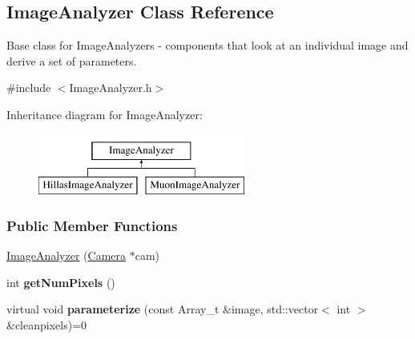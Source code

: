 \hypertarget{classImageAnalyzer}{
\subsection{ImageAnalyzer Class Reference}
\label{classImageAnalyzer}
}


Base class for ImageAnalyzers -\/ components that look at an individual image and derive a set of parameters.  




{\ttfamily \#include $<$ImageAnalyzer.h$>$}

Inheritance diagram for ImageAnalyzer:\begin{figure}[H]
\begin{center}
\leavevmode
\includegraphics[height=2.000000cm]{classImageAnalyzer}
\end{center}
\end{figure}
\subsubsection*{Public Member Functions}
\begin{DoxyCompactItemize}
\item 
\hypertarget{classImageAnalyzer_a36d9220eab04d031c21237abec9caffd}{
\hyperlink{classImageAnalyzer_a36d9220eab04d031c21237abec9caffd}{ImageAnalyzer} (\hyperlink{classCamera}{Camera} $\ast$cam)}
\label{classImageAnalyzer_a36d9220eab04d031c21237abec9caffd}

\item 
\hypertarget{classImageAnalyzer_aedee9bca28bf1104e6acf113033c4360}{
int {\bfseries getNumPixels} ()}
\label{classImageAnalyzer_aedee9bca28bf1104e6acf113033c4360}

\item 
\hypertarget{classImageAnalyzer_a34ca66f8166b4804c2a03fa0c155f2cc}{
virtual void {\bfseries parameterize} (const Array\_\-t \&image, std::vector$<$ int $>$ \&cleanpixels)=0}
\label{classImageAnalyzer_a34ca66f8166b4804c2a03fa0c155f2cc}

\end{DoxyCompactItemize}
